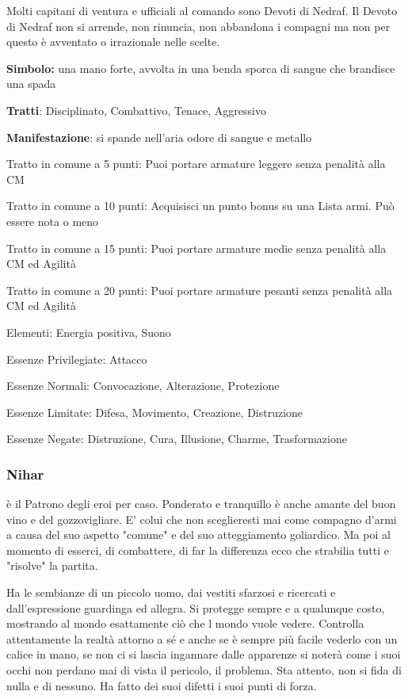 \documentclass[a4paper,11pt,twoside,openany]{book}
\begin{document}
Molti capitani di ventura e ufficiali al comando sono Devoti di Nedraf. Il Devoto di Nedraf non si arrende, non rinuncia, non abbandona i compagni ma non per questo è avventato o irrazionale nelle scelte.

\textbf{Simbolo:} una mano forte, avvolta in una benda sporca di sangue
che brandisce una spada

\textbf{Tratti}: Disciplinato, Combattivo, Tenace, Aggressivo

\textbf{Manifestazione}: si spande nell'aria odore di sangue e metallo

\bigskip

Tratto in comune a 5 punti: Puoi portare armature leggere senza penalità alla CM

Tratto in comune a 10 punti: Acquisisci un punto bonus su una Lista armi. Può essere nota o meno

Tratto in comune a 15 punti: Puoi portare armature medie senza penalità alla CM ed Agilità

Tratto in comune a 20 punti: Puoi portare armature pesanti senza penalità alla CM ed Agilità

\bigskip

Elementi: Energia positiva, Suono

\bigskip

Essenze Privilegiate: Attacco

Essenze Normali: Convocazione, Alterazione, Protezione

Essenze Limitate: Difesa, Movimento, Creazione, Distruzione

Essenze Negate: Distruzione, Cura, Illusione, Charme, Trasformazione

\subsubsection{Nihar}

\label{nihar}

è il Patrono degli eroi per caso. Ponderato e tranquillo è anche amante del buon vino e del gozzovigliare. E' colui che non sceglieresti mai come compagno d'armi a causa del suo aspetto "comune" e del suo atteggiamento goliardico. Ma poi al momento di esserci, di combattere, di far la differenza ecco che strabilia tutti e "risolve" la partita.

Ha le sembianze di un piccolo uomo, dai vestiti sfarzosi e ricercati e dall'espressione guardinga ed allegra. Si protegge sempre e a qualunque costo, mostrando al mondo esattamente ciò che l mondo vuole vedere. Controlla attentamente la realtà attorno a sé e anche se è sempre più facile vederlo con un calice in mano, se non ci si lascia ingannare dalle apparenze si noterà come i suoi occhi non perdano mai di vista il pericolo, il problema. Sta attento, non si fida di nulla e di nessuno. Ha fatto dei suoi difetti i suoi punti di forza.
\end{document}
